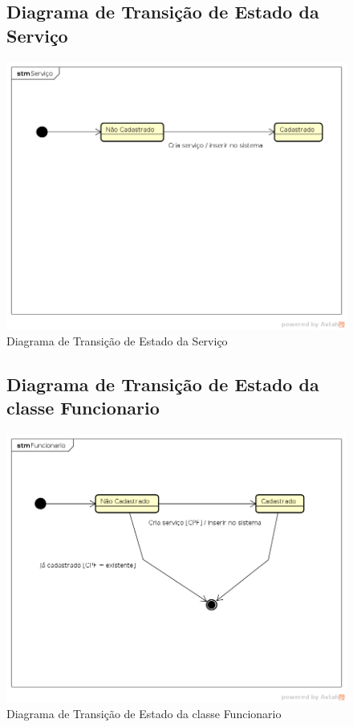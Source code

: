 \documentclass[
	12pt,				%
	openright,
	oneside,			%
	a4paper,			%
	chapter=TITLE,		%
	brazil				%
	]{abntex2}
\begin{document}
\begin{figure}[h!]
\subsection{Diagrama de Transição de Estado da Serviço }
	\caption{Diagrama de Transição de Estado da Serviço}
	\begin{center}
	    \includegraphics[scale=0.6]{Arquivos/DTE/Servico}  
	\end{center}
\end{figure}


\begin{figure}[h!]
\subsection{Diagrama de Transição de Estado da classe Funcionario}
	\caption{Diagrama de Transição de Estado da classe Funcionario}
	\begin{center}
	    \includegraphics[scale=0.6]{Arquivos/DTE/Funcionario}  
	\end{center}
\end{figure}
\end{document}
